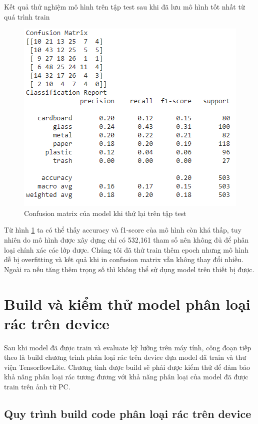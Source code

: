 Kết quả thử nghiệm mô hình trên tập test sau khi đã lưu mô hình tốt nhất từ quá trình train 
\begin{figure}[H]
    \centering
    \includegraphics[width=\linewidth]{images/Quanh/matrix.png}
    \caption{ Confusion matrix của model khi thử lại trên tập test}
    \label{fig:matrix}
\end{figure}
Từ hình \ref{fig:matrix} ta có thể thấy accuracy và f1-score của mô hình còn khá thấp, tuy nhiên do mô hình được xây dựng chỉ có 532,161 tham số nên không đủ để phân loại chính xác các lớp được. Chúng tôi đã thử train thêm epoch nhưng mô hình dễ bị overfitting và kết quả khi in confusion matrix vẫn không thay đổi nhiều. Ngoài ra nếu tăng thêm trọng số thì không thể sử dụng model trên thiết bị được.


\section{Build và kiểm thử model phân loại rác trên device}
Sau khi model đã được train và evaluate kỹ lưỡng trên máy tính, công đoạn tiếp theo là build chương trình phân loại rác trên device dựa model đã train và thư viện TensorflowLite. 
Chương tình được build sẽ phải được kiểm thử để đảm bảo khả năng phân loại rác tương đương với khả năng phân loại của model đã được train trên ảnh từ PC.
\subsection{Quy trình build code phân loại rác trên device}

